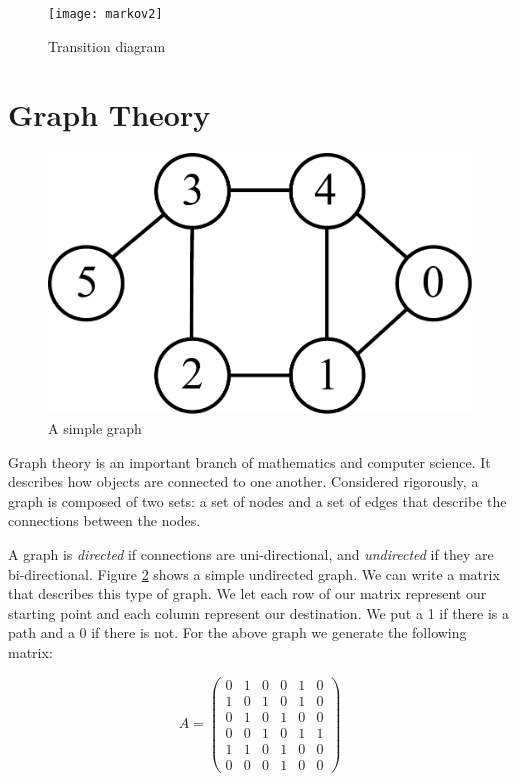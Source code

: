\begin{figure}[h!]
\begin{center}
\texttt{[image: markov2]}
\end{center}
\caption{Transition diagram}
\label{markov2}
\end{figure}

\newpage

\section*{Graph Theory}
\begin{figure}[h!]
\includegraphics[scale = .4]{graphExample}
\caption{A simple graph}
\label{markov:example_graph}
\end{figure}

Graph theory is an important branch of mathematics and computer science.
It describes how objects are connected to one another.
Considered rigorously, a graph is composed of two sets: a set of nodes and a set of edges that describe the connections between the nodes.

A graph is \emph{directed} if connections are uni-directional, and \emph{undirected} if they are bi-directional.
Figure \ref{markov:example_graph} shows a simple undirected graph.
We can write a matrix that describes this type of graph.
We let each row of our matrix represent our starting point and each column represent our destination.
We put a 1 if there is a path and a 0 if there is not.
For the above graph we generate the following matrix:

\[
A = \begin{pmatrix}
0 & 1 & 0 & 0 & 1 & 0\\
1 & 0 & 1 & 0 & 1 & 0\\
0 & 1 & 0 & 1 & 0 & 0\\
0 & 0 & 1 & 0 & 1 & 1\\
1 & 1 & 0 & 1 & 0 & 0\\
0 & 0 & 0 & 1 & 0 & 0
\end{pmatrix}
\]

